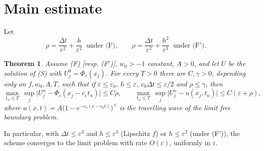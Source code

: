 \documentclass[11pt]{amsart}
\newtheorem{theorem}{Theorem}[section]
\theoremstyle{remark}
\newcommand{\ve}{\varepsilon}
\begin{document}
\section{Main estimate}\label{sec:main}

Let
\[
\rho=\frac{\Delta t}{\ve^2}+\frac{h}{\ve^2}\ \text{ under (F)},\qquad
\rho=\frac{\Delta t}{\ve^2}+\frac{h^2}{\ve^3}\ \text{ under (F$'$)}.
\]

\begin{theorem}\label{thm:main}
Assume (F) [resp. (F$'$)], $w_0>-1$ constant, $A>0$, and let $U$ be the solution
of (S) with $U^0_j=\Phi_\ve(x_j)$. For every $T>0$ there are $C,\gamma>0$,
depending only on $f,w_0,A,T$, such that if $\ve\le\ve_0$, $h\le\ve$,
$c_0\Delta t\le\ve/2$ and $\rho\le\gamma$, then
\[
\max_{t_n\le T}\ \sup_j\big|U^n_j-\Phi_\ve(x_j-c_\ve t_n)\big|\le C\rho,
\qquad
\max_{t_n\le T}\ \sup_j\big|U^n_j-u(x_j,t_n)\big|\le C(\ve+\rho),
\]
where $u(x,t)=A\big(1-e^{-c_0(x-c_0t)}\big)^+$ is the travelling wave of the
limit free boundary problem.
\end{theorem}

In particular, with $\Delta t\le\ve^3$ and $h\le\ve^3$ (Lipschitz $f$) or
$h\le\ve^2$ (under (F$'$)), the scheme converges to the limit problem with
rate $O(\ve)$, uniformly in $\ve$.
\end{document}
